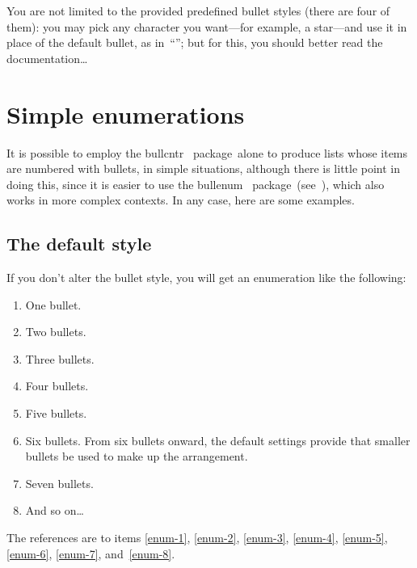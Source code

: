 \documentclass[a4paper]{article}
\DeclareRobustCommand*{\packlass}[1]{%
	{\texorpdfstring{\normalfont \sffamily}{}#1}%
}
\newcommand*{\Bullcntr}{bullcntr}
\newcommand*{\bull}{\packlass{\Bullcntr}}
\newcommand*{\tbull}{the \bull\ package}
\newcommand*{\Bullenum}{bullenum}
\newcommand*{\benu}{\packlass{\Bullenum}}
\newcommand*{\tbenu}{the \benu\ package}
\begin{document}
\renewcommand*{\counterlargebullet}{$\scriptstyle \star$}

You are not limited to the provided predefined bullet styles (there
are four of them): you may pick any character you want---for example,
a star---and use it in place of the default bullet, as
in~``\themycntr''; but for this, you should better read the
documentation\ldots



\section{Simple enumerations}

It is possible to employ \tbull\ alone to produce lists whose items
are numbered with bullets, in simple situations, although there is
little point in doing this, since it is easier to use \tbenu\
(see~\cite{enum-sam}), which also works in more complex contexts.  In
any case, here are some examples.

\smartctrbull



\subsection{The default style}

If you don't alter the bullet style, you will get an enumeration like
the following:

\begin{enumerate}
	\renewcommand*{\theenumi}{\bullcntr{enumi}}
	\renewcommand*{\labelenumi}{\theenumi}
	
	\item\label{enum-1}  One bullet.
	\item\label{enum-2}  Two bullets.
	\item\label{enum-3}  Three bullets.
	\item\label{enum-4}  Four bullets.
	\item\label{enum-5}  Five bullets.
	\item\label{enum-6}  Six bullets.  From six bullets onward,
		the default settings provide that smaller bullets be used to
		make up the arrangement.
	\item\label{enum-7}  Seven bullets.
	\item\label{enum-8}  And so on\ldots
\end{enumerate}

The references are to items \ref{enum-1}, \ref{enum-2}, \ref{enum-3},
\ref{enum-4}, \ref{enum-5}, \ref{enum-6}, \ref{enum-7},
and~\ref{enum-8}.
\end{document}
